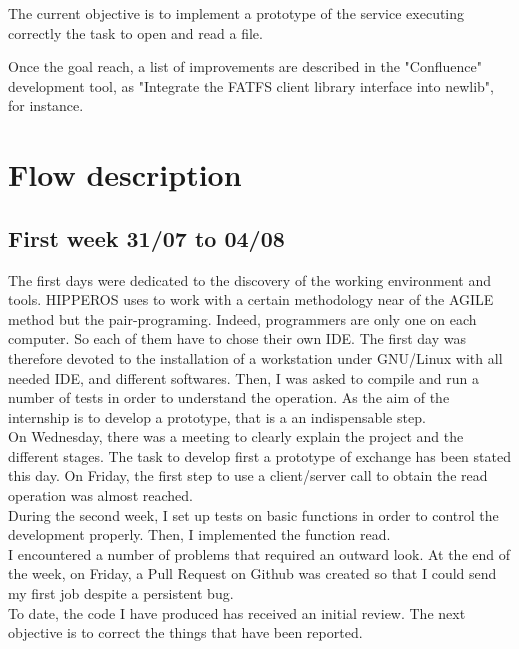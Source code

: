\documentclass[12pt]{article}
\begin{document}
The current objective is to implement a prototype of the service executing correctly the 
task to open and read a file. 

Once the goal reach, a list of improvements are described in the "Confluence" development tool, 
as "Integrate the FATFS client library interface into newlib", for instance.

\section{Flow description}
\subsection{First week 31/07 to 04/08}
The first days were dedicated to the discovery of the working environment and tools. 
HIPPEROS uses to work with a certain methodology near of the AGILE method but the pair-programing. 
Indeed, programmers are only one on each computer. So each of them have to chose their 
own IDE. The first day was therefore devoted to the installation of a workstation under GNU/Linux with 
all needed IDE, and different softwares.
Then, I was asked to compile and run a number of tests in order to understand the operation.
As the aim of the internship is to develop a prototype, that is a an indispensable step.\\

On Wednesday, there was a meeting to clearly explain the project and the different stages. 
The task to develop first a prototype of exchange has been stated this day.
On Friday, the first step to use a client/server call to obtain the read operation was almost reached.\\

During the second week, I set up tests on basic functions in order to control the development properly. 
Then, I implemented the function read.\\

I encountered a number of problems that required an outward look. 
At the end of the week, on Friday, a Pull Request on Github was created so that I could send my first job despite a persistent bug.\\

To date, the code I have produced has received an initial review. 
The next objective is to correct the things that have been reported.
\end{document}
